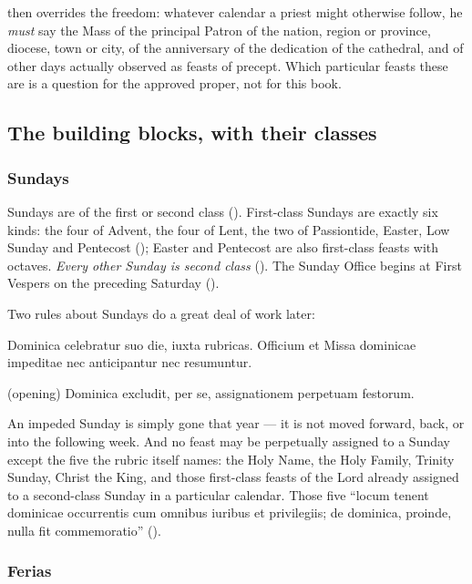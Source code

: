  then overrides the freedom: whatever calendar a priest might
otherwise follow, he \emph{must} say the Mass of the principal Patron of the
nation, region or province, diocese, town or city, of the anniversary of the
dedication of the cathedral, and of other days actually observed as feasts of
precept. Which particular feasts these are is a question for the approved
proper, not for this book.

\subsection{The building blocks, with their classes}

\subsubsection*{Sundays}

Sundays are of the first or second class (). First-class Sundays are
exactly six kinds: the four of Advent, the four of Lent, the two of
Passiontide, Easter, Low Sunday and Pentecost (); Easter and Pentecost
are also first-class feasts with octaves. \emph{Every other Sunday is second
class} (). The Sunday Office begins at First Vespers on the preceding
Saturday ().

Two rules about Sundays do a great deal of work later:

\begin{rulebox}{}
Dominica celebratur suo die, iuxta rubricas. Officium et Missa dominicae
impeditae nec anticipantur nec resumuntur.
\end{rulebox}

\begin{rulebox}{ (opening)}
Dominica excludit, per se, assignationem perpetuam festorum.
\end{rulebox}

\noindent
An impeded Sunday is simply gone that year --- it is not moved forward, back,
or into the following week. And no feast may be perpetually assigned to a
Sunday except the five the rubric itself names: the Holy Name, the Holy
Family, Trinity Sunday, Christ the King, and those first-class feasts of the
Lord already assigned to a second-class Sunday in a particular calendar. Those
five ``locum tenent dominicae occurrentis cum omnibus iuribus et privilegiis;
de dominica, proinde, nulla fit commemoratio'' ().

\subsubsection*{Ferias}

